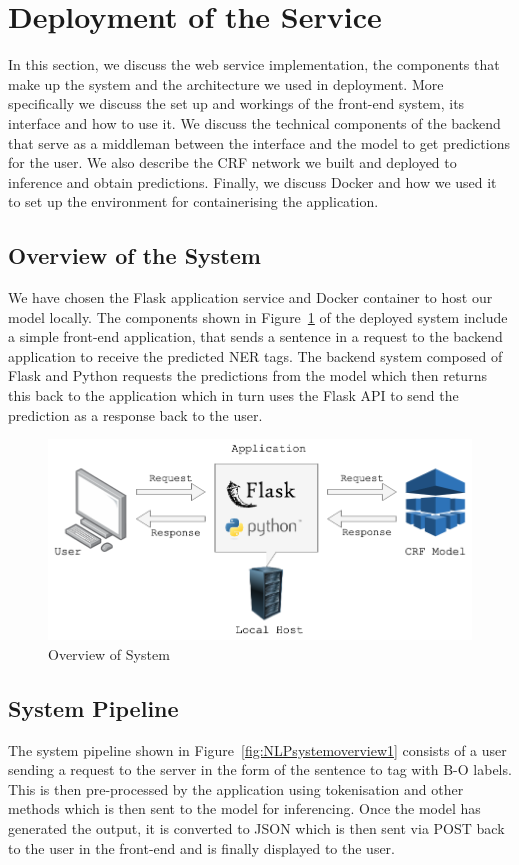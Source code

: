 \documentclass{surreydissertation}
\begin{document}
\section{Deployment of the Service}
\label{sec:deployment}
In this section, we discuss the web service implementation, the components that make up the system and the architecture we used in deployment. More specifically we discuss the set up and workings of the front-end system, its interface and how to use it. We discuss the technical components of the backend that serve as a middleman between the interface and the model to get predictions for the user. We also describe the CRF network we built and deployed to inference and obtain predictions. Finally, we discuss Docker and how we used it to set up the environment for containerising the application.

\subsection{Overview of the System}
\label{sec:system-overview}
We have chosen the Flask application service and Docker container to host our model locally. The components  shown in Figure~\ref{fig:NLPsystemoverview2} of the deployed system include a simple front-end application, that sends a sentence in a request to the backend application to receive the predicted NER tags. The backend system composed of Flask and Python requests the predictions from the model which then returns this back to the application which in turn uses the Flask API to send the prediction as a response back to the user.


\begin{figure}[H]
    \centering
    \includegraphics[width=0.9\linewidth]{Figures/NLPsystemoverview2.png}
    \caption{Overview of System}
    \label{fig:NLPsystemoverview2}
 \end{figure}

\subsection{System Pipeline}
The system pipeline shown in Figure~\ref{fig:NLPsystemoverview1} consists of a user sending a request to the server in the form of the sentence to tag with B-O labels. This is then pre-processed by the application using tokenisation and other methods which is then sent to the model for inferencing. Once the model has generated the output, it is converted to JSON which is then sent via POST back to the user in the front-end and is finally displayed to the user.
\end{document}
